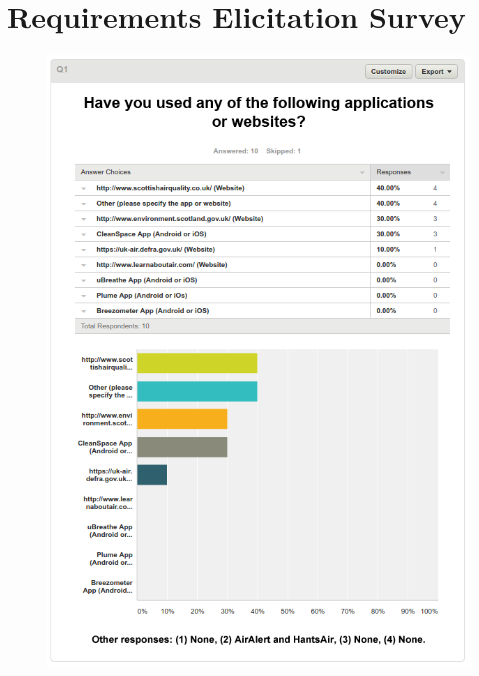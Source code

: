 \chapter{Requirements Elicitation Survey} 
\begin{figure}[H]
\begin{adjustbox}{width=.8\textwidth,center=\textwidth}
  \centering
  \includegraphics[scale=1]{surveys/q1.png}
\end{adjustbox}
\end{figure}
